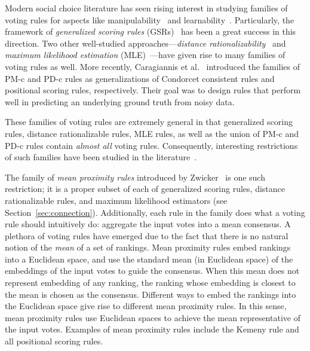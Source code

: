 \documentclass[prodmode]{acmsmall-ec14}
\newcommand{\kibitz}[2]{\ifnum\Comments=1\textcolor{#1}{#2}\fi}
\newcommand{\ns}[1]{\kibitz{red} {[NS: #1]}}
\begin{document}
Modern social choice literature has seen rising interest in studying families of voting rules for aspects like manipulability~\cite{Gib73,Sat75} and learnability~\cite{PZR08}. Particularly, the framework of \emph{generalized scoring rules} (GSRs)~\cite{XC08} has been a great success in this direction. Two other well-studied approaches---\emph{distance rationalizability}~\cite{MN08,EFS10,elkind2010good} and \emph{maximum likelihood estimation} (MLE)~\cite{Con85,Young88,CS05b}---have given rise to many families of voting rules as well. More recently, Caragiannis et al.~ introduced the families of PM-c and PD-c rules as generalizations of Condorcet consistent rules and positional scoring rules, respectively. Their goal was to design rules that perform well in predicting an underlying ground truth from noisy data. 

These families of voting rules are extremely general in that generalized scoring rules, distance rationalizable rules, MLE rules, as well as the union of PM-c and PD-c rules contain \emph{almost all} voting rules. Consequently, interesting restrictions of such families have been studied in the literature~\cite{CPS14,EFS10,elkind2010good,CS05b}. 


The family of \emph{mean proximity rules} introduced by Zwicker~ is one such restriction; it is a proper subset of each of generalized scoring rules, distance rationalizable rules, and maximum likelihood estimators (see Section~\ref{sec:connection}). Additionally, each rule in the family does what a voting rule should intuitively do: aggregate the input votes into a mean consensus. A plethora of voting rules have emerged due to the fact that there is no natural notion of the \emph{mean} of a set of rankings. Mean proximity rules embed rankings into a Euclidean space, and use the standard mean (in Euclidean space) of the embeddings of the input votes to guide the consensus. When this mean does not represent embedding of any ranking, the ranking whose embedding is closest to the mean is chosen as the consensus. Different ways to embed the rankings into the Euclidean space give rise to different mean proximity rules. In this sense, mean proximity rules use Euclidean spaces to achieve the mean representative of the input votes. Examples of mean proximity rules include the Kemeny rule and all positional scoring rules. 
\end{document}
